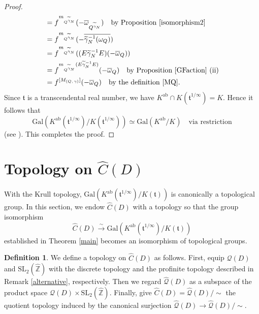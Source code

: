 \documentclass[reqno,11pt]{article}
\theoremstyle{plain} %
\theoremstyle{definition} %
\newtheorem{definition}[theorem]{\indent\sc Definition}
\begin{document}
\begin{proof}
\begin{align*}
&=f^{m_{Q^{\widetilde{\gamma}_N}}}(-\overline{\omega}_{Q^{\widetilde{\gamma}_N}})
\quad\textrm{by Proposition \ref{isomorphism2}}\\
&=f^{m_{Q^{\widetilde{\gamma}_N}}}(-\overline{\widetilde{\gamma}_N^{-1}(\omega_Q)})\\
&=f^{m_{Q^{\widetilde{\gamma}_N}}}((E\widetilde{\gamma}_N^{-1}E)(-\overline{\omega}_Q))\\
&=f^{m_{Q^{\widetilde{\gamma}_N}}(E\widetilde{\gamma}_N^{-1}E)}(-\overline{\omega}_Q)
\quad\textrm{by Proposition \ref{GFaction} (ii)}\\
&=f^{[M_{(Q,\,\gamma)}]}(-\overline{\omega}_Q)
\quad\textrm{by the definition \eqref{MQ}}. 
\end{align*}
Since $\mathfrak{t}$ is a transcendental real number, we have
$K^\mathrm{ab}\cap K(\mathfrak{t}^{1/\infty})=K$. Hence it follows that
\begin{equation}\label{GKKGKK}
\mathrm{Gal}\left(K^\mathrm{ab}(\mathfrak{t}^{1/\infty})/K(\mathfrak{t}^{1/\infty})\right)
\simeq\mathrm{Gal}(K^\mathrm{ab}/K)\quad\textrm{via restriction}
\end{equation}
(see \cite[Theorem 1.12 in Chapter VI]{Lang}). 
This completes the proof. 
\end{proof}

\section {Topology on $\widehat{C}(D)$}

With the Krull topology, $\mathrm{Gal}\left(K^\mathrm{ab}(\mathfrak{t}^{1/\infty})/K(\mathfrak{t})\right)$
is canonically a topological group. 
In this section, we endow $\widehat{C}(D)$ with a topology
so that the group isomorphism
\begin{equation*}
\widehat{C}(D)
\stackrel{\sim}{\rightarrow}\mathrm{Gal}\left(K^\mathrm{ab}(\mathfrak{t}^{1/\infty})/K(\mathfrak{t})\right)
\end{equation*}
established in Theorem \ref{main}
becomes an isomorphism of topological groups. 

\begin{definition}\label{topology}
We define a topology on $\widehat{C}(D)$ as follows.
First, equip $\mathcal{Q}(D)$ and $\mathrm{SL}_2(\widehat{\mathbb{Z}})$
with the discrete topology and the profinite topology
described in Remark \ref{alternative}, respectively.
Then we regard $\widehat{\mathcal{Q}}(D)$
as a subspace of the product space $\mathcal{Q}(D)
\times \mathrm{SL}_2(\widehat{\mathbb{Z}})$.
Finally, give $\widehat{C}(D)=\widehat{\mathcal{Q}}(D)/\sim$
the quotient topology
induced by the canonical surjection $\widehat{\mathcal{Q}}(D)
\rightarrow\widehat{\mathcal{Q}}(D)/\sim$.
\end{definition}
\end{document}
